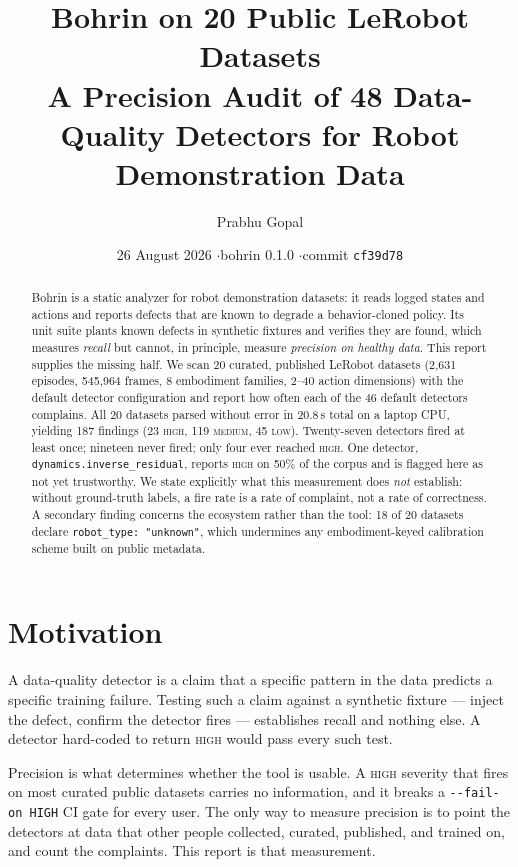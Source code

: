 \documentclass[10pt,a4paper]{article}
\title{\vspace{-2.2em}\textbf{Bohrin on 20 Public LeRobot Datasets}\\[0.35em]
\large A Precision Audit of 48 Data-Quality Detectors for Robot Demonstration Data}
\author{Prabhu Gopal}
\date{26 August 2026 \quad$\cdot$\quad bohrin 0.1.0 \quad$\cdot$\quad commit \texttt{cf39d78}}
\newcommand{\dtr}[1]{\texttt{\small #1}}
\begin{document}
\maketitle

\begin{abstract}
\noindent
Bohrin is a static analyzer for robot demonstration datasets: it reads logged states and
actions and reports defects that are known to degrade a behavior-cloned policy. Its unit
suite plants known defects in synthetic fixtures and verifies they are found, which
measures \emph{recall} but cannot, in principle, measure \emph{precision on healthy data}.
This report supplies the missing half. We scan 20 curated, published LeRobot datasets
(2{,}631 episodes, 545{,}964 frames, 8 embodiment families, 2--40 action dimensions) with
the default detector configuration and report how often each of the 46 default detectors
complains. All 20 datasets parsed without error in 20.8\,s total on a laptop CPU, yielding
187 findings (23 \textsc{high}, 119 \textsc{medium}, 45 \textsc{low}). Twenty-seven
detectors fired at least once; nineteen never fired; only four ever reached
\textsc{high}. One detector, \dtr{dynamics.inverse\_residual}, reports \textsc{high} on
50\% of the corpus and is flagged here as not yet trustworthy. We state explicitly what
this measurement does \emph{not} establish: without ground-truth labels, a fire rate is a
rate of complaint, not a rate of correctness. A secondary finding concerns the ecosystem
rather than the tool: 18 of 20 datasets declare \mbox{\texttt{robot\_type:\,"unknown"}}, which
undermines any embodiment-keyed calibration scheme built on public metadata.
\end{abstract}

\section{Motivation}

A data-quality detector is a claim that a specific pattern in the data predicts a specific
training failure. Testing such a claim against a synthetic fixture --- inject the defect,
confirm the detector fires --- establishes recall and nothing else. A detector hard-coded
to return \textsc{high} would pass every such test.

Precision is what determines whether the tool is usable. A \textsc{high} severity that
fires on most curated public datasets carries no information, and it breaks a
\texttt{-{}-fail-on HIGH} CI gate for every user. The only way to measure precision is to
point the detectors at data that other people collected, curated, published, and trained
on, and count the complaints. This report is that measurement.
\end{document}
